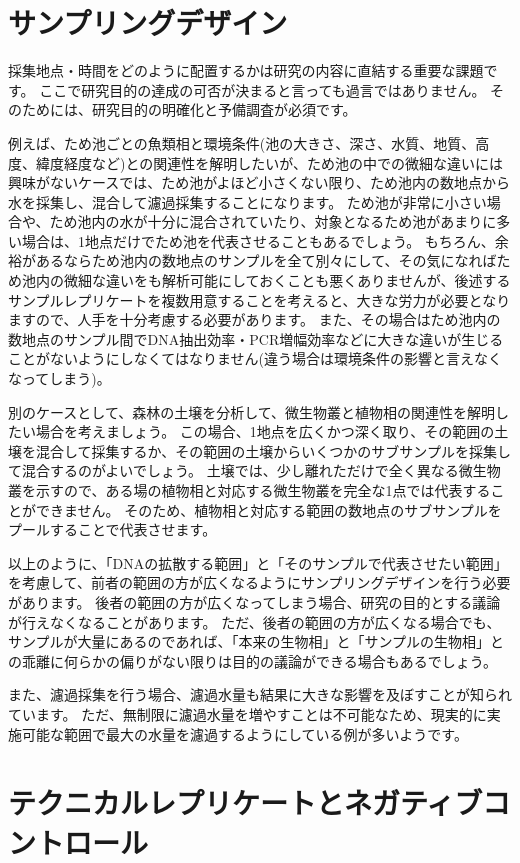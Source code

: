 \documentclass[titlepage,10pt,a4paper]{jsbook}
\begin{document}
\section{サンプリングデザイン}

採集地点・時間をどのように配置するかは研究の内容に直結する重要な課題です。
ここで研究目的の達成の可否が決まると言っても過言ではありません。
そのためには、研究目的の明確化と予備調査が必須です。

例えば、ため池ごとの魚類相と環境条件(池の大きさ、深さ、水質、地質、高度、緯度経度など)との関連性を解明したいが、ため池の中での微細な違いには興味がないケースでは、ため池がよほど小さくない限り、ため池内の数地点から水を採集し、混合して濾過採集することになります。
ため池が非常に小さい場合や、ため池内の水が十分に混合されていたり、対象となるため池があまりに多い場合は、1地点だけでため池を代表させることもあるでしょう。
もちろん、余裕があるならため池内の数地点のサンプルを全て別々にして、その気になればため池内の微細な違いをも解析可能にしておくことも悪くありませんが、後述するサンプルレプリケートを複数用意することを考えると、大きな労力が必要となりますので、人手を十分考慮する必要があります。
また、その場合はため池内の数地点のサンプル間でDNA抽出効率・PCR増幅効率などに大きな違いが生じることがないようにしなくてはなりません(違う場合は環境条件の影響と言えなくなってしまう)。

別のケースとして、森林の土壌を分析して、微生物叢と植物相の関連性を解明したい場合を考えましょう。
この場合、1地点を広くかつ深く取り、その範囲の土壌を混合して採集するか、その範囲の土壌からいくつかのサブサンプルを採集して混合するのがよいでしょう。
土壌では、少し離れただけで全く異なる微生物叢を示すので、ある場の植物相と対応する微生物叢を完全な1点では代表することができません。
そのため、植物相と対応する範囲の数地点のサブサンプルをプールすることで代表させます。

以上のように、「DNAの拡散する範囲」と「そのサンプルで代表させたい範囲」を考慮して、前者の範囲の方が広くなるようにサンプリングデザインを行う必要があります。
後者の範囲の方が広くなってしまう場合、研究の目的とする議論が行えなくなることがあります。
ただ、後者の範囲の方が広くなる場合でも、サンプルが大量にあるのであれば、「本来の生物相」と「サンプルの生物相」との乖離に何らかの偏りがない限りは目的の議論ができる場合もあるでしょう。

また、濾過採集を行う場合、濾過水量も結果に大きな影響を及ぼすことが知られています。
ただ、無制限に濾過水量を増やすことは不可能なため、現実的に実施可能な範囲で最大の水量を濾過するようにしている例が多いようです。

\section{テクニカルレプリケートとネガティブコントロール}
\end{document}
